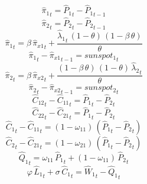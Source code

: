 \begin{dmath}
{{\hat{\pi}_{1}}}_{t}={{\hat{P}_{1}}}_{t}-{{\hat{P}_{1}}}_{t-1}
\end{dmath}
\begin{dmath}
{{\hat{\pi}_{2}}}_{t}={{\hat{P}_{2}}}_{t}-{{\hat{P}_{2}}}_{t-1}
\end{dmath}
\begin{dmath}
{{\hat{\pi}_{1}}}_{t}={{\beta}}\, {{\hat{\pi}_{x1}}}_{t}+\frac{{{\hat{\lambda}_{1}}}_{t}\, \left(1-{{\theta}}\right)\, \left(1-{{\beta}}\, {{\theta}}\right)}{{{\theta}}}
\end{dmath}
\begin{dmath}
{{\hat{\pi}_{1}}}_{t}-{{\hat{\pi}_{x1}}}_{t-1}={{sunspot_{1}}}_{t}
\end{dmath}
\begin{dmath}
{{\hat{\pi}_{2}}}_{t}={{\beta}}\, {{\hat{\pi}_{x2}}}_{t}+\frac{\left(1-{{\beta}}\, {{\theta}}\right)\, \left(1-{{\theta}}\right)\, {{\hat{\lambda}_{2}}}_{t}}{{{\theta}}}
\end{dmath}
\begin{dmath}
{{\hat{\pi}_{2}}}_{t}-{{\hat{\pi}_{x2}}}_{t-1}={{sunspot_{2}}}_{t}
\end{dmath}
\begin{dmath}
{{\hat{C}_{12}}}_{t}-{{\hat{C}_{11}}}_{t}={{\hat{P}_{1}}}_{t}-{{\hat{P}_{2}}}_{t}
\end{dmath}
\begin{dmath}
{{\hat{C}_{22}}}_{t}-{{\hat{C}_{21}}}_{t}={{\hat{P}_{1}}}_{t}-{{\hat{P}_{2}}}_{t}
\end{dmath}
\begin{dmath}
{{\hat{C}_{1}}}_{t}-{{\hat{C}_{11}}}_{t}=\left(1-{{\omega_{11}}}\right)\, \left({{\hat{P}_{1}}}_{t}-{{\hat{P}_{2}}}_{t}\right)
\end{dmath}
\begin{dmath}
{{\hat{C}_{2}}}_{t}-{{\hat{C}_{21}}}_{t}=\left(1-{{\omega_{21}}}\right)\, \left({{\hat{P}_{1}}}_{t}-{{\hat{P}_{2}}}_{t}\right)
\end{dmath}
\begin{dmath}
{{\hat{Q}_{1}}}_{t}={{\omega_{11}}}\, {{\hat{P}_{1}}}_{t}+\left(1-{{\omega_{11}}}\right)\, {{\hat{P}_{2}}}_{t}
\end{dmath}
\begin{dmath}
{{\varphi}}\, {{\hat{L}_{1}}}_{t}+{{\sigma}}\, {{\hat{C}_{1}}}_{t}={{\hat{W}_{1}}}_{t}-{{\hat{Q}_{1}}}_{t}
\end{dmath}

